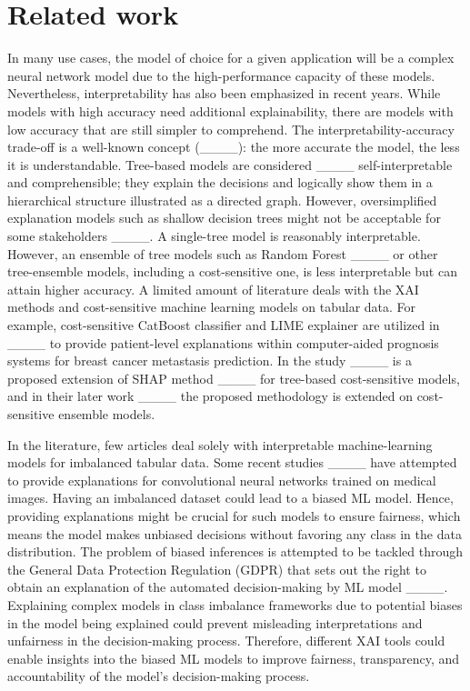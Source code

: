 \section{Related work}
In many use cases, the model of choice for a given application will be a complex neural network model due to the high-performance capacity of these models. Nevertheless, interpretability has also been emphasized in recent years. While models with high accuracy need additional explainability, there are models with low accuracy that are still simpler to comprehend. The interpretability-accuracy trade-off is a well-known concept (____): the more accurate the model, the less it is understandable. Tree-based models are considered ____ self-interpretable and comprehensible; they explain the decisions and logically show them in a hierarchical structure illustrated as a directed graph. However, oversimplified explanation models such as shallow decision trees might not be acceptable for some stakeholders ____. A single-tree model is reasonably interpretable. However, an ensemble of tree models such as Random Forest ____ or other tree-ensemble models, including a cost-sensitive one, is less interpretable but can attain higher accuracy. A limited amount of literature deals with the XAI methods and cost-sensitive machine learning models on tabular data. For example, cost-sensitive CatBoost classifier and LIME explainer are utilized in ____ to provide patient-level explanations within computer-aided prognosis systems for breast cancer metastasis prediction. In the study ____ is a proposed extension of SHAP method ____ for tree-based cost-sensitive models, and in their later work ____ the proposed methodology is extended on cost-sensitive ensemble models. 

In the literature, few articles deal solely with interpretable machine-learning models for imbalanced tabular data. Some recent studies ____ have attempted to provide explanations for convolutional neural networks trained on medical images. Having an imbalanced dataset could lead to a biased ML model. Hence, providing explanations might be crucial for such models to ensure fairness, which means the model makes unbiased decisions without favoring any class in the data distribution. The problem of biased inferences is attempted to be tackled through the General Data Protection Regulation (GDPR) that sets out the right to obtain an explanation of the automated decision-making by ML model ____. Explaining complex models in class imbalance frameworks due to potential biases in the model being explained could prevent misleading interpretations and unfairness in the decision-making process. Therefore, different XAI tools could enable insights into the biased ML models to improve fairness, transparency, and accountability of the model's decision-making process.

